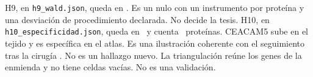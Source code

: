 H9, en \texttt{h9\_wald.json}, queda en \VcincoHnueve. Es un nulo con un instrumento por proteína y una desviación de procedimiento declarada. No decide la tesis. H10, en \texttt{h10\_especificidad.json}, queda en \VcincoHdiez\ y cuenta \VcincoHdiezN\ proteínas. CEACAM5 sube en el tejido y es específica en el atlas. Es una ilustración coherente con el seguimiento tras la cirugía \cite{locker2006}. No es un hallazgo nuevo. La triangulación reúne los genes de la enmienda y no tiene celdas vacías. No es una validación.

\VcincoAdvertencia
